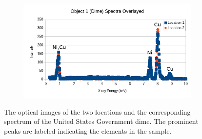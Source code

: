 \documentclass[10pt]{IEEEtran}
\begin{document}
\begin{center}
\begin{figure}[!t]
    ~ %
    \begin{subfigure}[!t]{0.41\textwidth}
        \includegraphics[width=\textwidth]{Object1}
        \label{fig:Object1}
    \end{subfigure}
    \caption{The optical images of the two locations and the corresponding spectrum of the United States Government dime. The prominent peaks are labeled indicating the elements in the sample.}
    \label{fig:objects1}
\end{figure}


\end{center}
\end{document}

